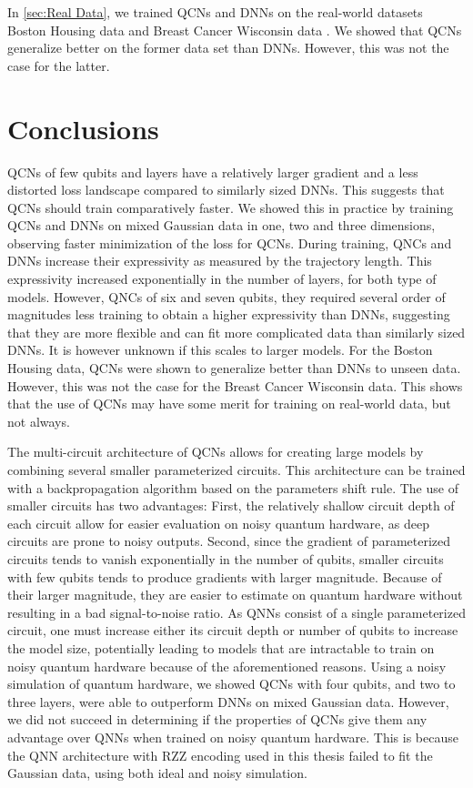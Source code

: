 In \autoref{sec:Real Data}, we trained QCNs and DNNs on the real-world datasets Boston Housing data \cite{boston} and Breast Cancer Wisconsin data \cite{cancer}. We showed that QCNs generalize better on the former data set than DNNs. However, this was not the case for the latter.  


\section{Conclusions}\label{sec:conclusion}
QCNs of few qubits and layers have a relatively larger gradient and a less distorted loss landscape compared to similarly sized DNNs. This suggests that QCNs should train comparatively faster. We showed this in practice by training QCNs and DNNs on mixed Gaussian data in one, two and three dimensions, observing faster minimization of the loss for QCNs. During training, QNCs and DNNs increase their expressivity as measured by the trajectory length. This expressivity increased exponentially in the number of layers, for both type of models. However, QNCs of six and seven qubits, they required several order of magnitudes less training to obtain a higher expressivity than DNNs, suggesting that they are more flexible and can fit more complicated data than similarly sized DNNs. It is however unknown if this scales to larger models. For the Boston Housing data, QCNs were shown to generalize better than DNNs to unseen data. However, this was not the case for the Breast Cancer Wisconsin data. This shows that the use of QCNs may have some merit for training on real-world data, but not always.

The multi-circuit architecture of QCNs allows for creating large models by combining several smaller parameterized circuits. This architecture can be trained with a backpropagation algorithm based on the parameters shift rule. The use of smaller circuits has two advantages: First, the relatively shallow circuit depth of each circuit allow for easier evaluation on noisy quantum hardware, as deep circuits are prone to noisy outputs. Second, since the gradient of parameterized circuits tends to vanish exponentially in the number of qubits, smaller circuits with few qubits tends to produce gradients with larger magnitude. Because of their larger magnitude, they are easier to estimate on quantum hardware without resulting in a bad signal-to-noise ratio.
As QNNs consist of a single parameterized circuit, one must increase either its circuit depth or number of qubits to increase the model size, potentially leading to models that are intractable to train on noisy quantum hardware because of the aforementioned reasons. Using a noisy simulation of quantum hardware, we showed QCNs with four qubits, and two to three layers, were able to outperform DNNs on mixed Gaussian data. However, we did not succeed in determining if the properties of QCNs give them any advantage over QNNs when trained on noisy quantum hardware. This is because the QNN architecture with RZZ encoding used in this thesis failed to fit the Gaussian data, using both ideal and noisy simulation. 

